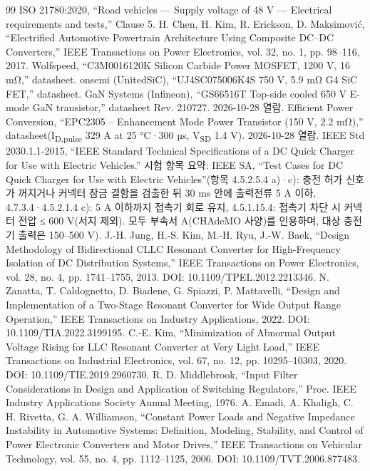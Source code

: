 \begin{thebibliography}{99}
 ISO 21780:2020, “Road vehicles — Supply voltage of 48 V — Electrical requirements and tests,” Clause 5.
 H. Chen, H. Kim, R. Erickson, D. Maksimovi{\fallbackfont ć}, “Electrified Automotive Powertrain Architecture Using Composite DC–DC Converters,” IEEE Transactions on Power Electronics, vol. 32, no. 1, pp. 98–116, 2017.
 Wolfspeed, “C3M0016120K Silicon Carbide Power MOSFET, 1200 V, 16 mΩ,” datasheet.
 onsemi (UnitedSiC), “UJ4SC075006K4S 750 V, 5.9 mΩ G4 SiC FET,” datasheet.
 GaN Systems (Infineon), “GS66516T Top-side cooled 650 V E-mode GaN transistor,” datasheet Rev. 210727. 2026-10-28 열람.
 Efficient Power Conversion, “EPC2305 – Enhancement Mode Power Transistor (150 V, 2.2 mΩ),” datasheet(I\textsubscript{D,pulse} 329 A at 25 °C·300 µs, V\textsubscript{SD} 1.4 V). 2026-10-28 열람.
 IEEE Std 2030.1.1-2015, “IEEE Standard Technical Specifications of a DC Quick Charger for Use with Electric Vehicles.” 시험 항목 요약: IEEE SA, “Test Cases for DC Quick Charger for Use with Electric Vehicles”(항목 4.5.2.5.4 a)·c): 충전 허가 신호가 꺼지거나 커넥터 잠금 결함을 검출한 뒤 30 ms 안에 출력전류 5 A 이하, 4.7.3.4·4.5.2.1.4 c): 5 A 이하까지 접촉기 회로 유지, 4.5.1.15.4: 접촉기 차단 시 커넥터 전압 ≤ 600 V(서지 제외). 모두 부속서 A(CHAdeMO 사양)를 인용하며, 대상 충전기 출력은 150–500 V).
 J.-H. Jung, H.-S. Kim, M.-H. Ryu, J.-W. Baek, “Design Methodology of Bidirectional CLLC Resonant Converter for High-Frequency Isolation of DC Distribution Systems,” IEEE Transactions on Power Electronics, vol. 28, no. 4, pp. 1741–1755, 2013. DOI: 10.1109/TPEL.2012.2213346.
 N. Zanatta, T. Caldognetto, D. Biadene, G. Spiazzi, P. Mattavelli, “Design and Implementation of a Two-Stage Resonant Converter for Wide Output Range Operation,” IEEE Transactions on Industry Applications, 2022. DOI: 10.1109/TIA.2022.3199195.
 C.-E. Kim, “Minimization of Abnormal Output Voltage Rising for LLC Resonant Converter at Very Light Load,” IEEE Transactions on Industrial Electronics, vol. 67, no. 12, pp. 10295–10303, 2020. DOI: 10.1109/TIE.2019.2960730.
 R. D. Middlebrook, “Input Filter Considerations in Design and Application of Switching Regulators,” Proc. IEEE Industry Applications Society Annual Meeting, 1976.
 A. Emadi, A. Khaligh, C. H. Rivetta, G. A. Williamson, “Constant Power Loads and Negative Impedance Instability in Automotive Systems: Definition, Modeling, Stability, and Control of Power Electronic Converters and Motor Drives,” IEEE Transactions on Vehicular Technology, vol. 55, no. 4, pp. 1112–1125, 2006. DOI: 10.1109/TVT.2006.877483.

\end{thebibliography}

